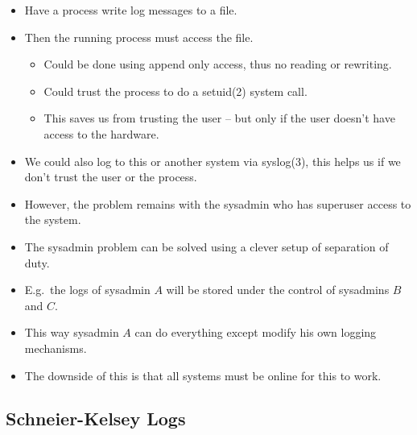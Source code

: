 \begin{frame}
  \begin{itemize}
    \item Have a process write log messages to a file.

    \item Then the running process must access the file.
      \begin{itemize}
        \item Could be done using append only access, thus no reading or 
          rewriting.

        \item Could trust the process to do a setuid(2) system call.

        \item This saves us from trusting the user -- but only if the user 
          doesn't have access to the hardware.

      \end{itemize}

    \item We could also log to this or another system via syslog(3), this helps 
      us if we don't trust the user or the process.

    \item However, the problem remains with the sysadmin who has superuser 
      access to the system.

  \end{itemize}
\end{frame}

\begin{frame}
  \begin{itemize}
    \item The sysadmin problem can be solved using a clever setup of separation 
      of duty.

    \item E.g.\ the logs of sysadmin \(A\) will be stored under the control of 
      sysadmins \(B\) and \(C\).

    \item This way sysadmin \(A\) can do everything except modify his own 
      logging mechanisms.

    \item The downside of this is that all systems must be online for this to 
      work.

  \end{itemize}
\end{frame}

\subsection{Schneier-Kelsey Logs}

